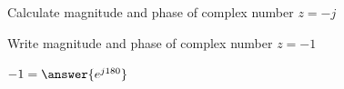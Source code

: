 \documentclass{ximera}
\begin{document}
\begin{example}
\begin{explanation}
\begin{image}
\end{image}


\end{explanation}
\end{example}


\begin{question}
Calculate magnitude and phase of 
complex number $z=-j$ 
\begin{multipleChoice}  
\end{multipleChoice}
\end{question}
  
  
  
  
  
  
  
  
  
  
  
  
  
  
  
  
  
  
  
  
  
  
  
  Write magnitude and phase of complex number $z=-1$
\begin{question}  
         $ -1 =  \answer{e^{j180}}$  
    \end{question} 
    
    
    
    
    
    
    
    
    
    
    
    
    
    
    
    
    
    
    
\end{document}
